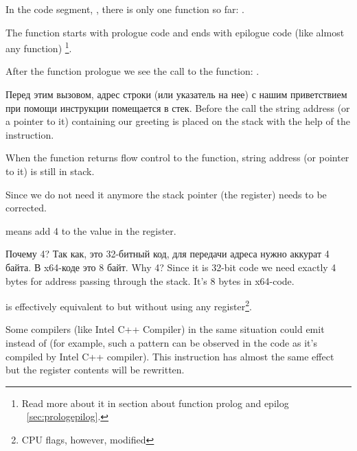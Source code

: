 {In the code segment, , there is only one function so far}: \main.

{The function \main starts with prologue code and ends with epilogue code (like almost any function)}
\footnote{
{Read more about it in section about function prolog and epilog}
~\ref{sec:prologepilog}.}.

{After the function prologue we see the call to the \printf function}: . 

\IFRU
{Перед этим вызовом, адрес строки (или указатель на нее) с нашим приветствием при помощи инструкции \PUSH помещается в стек.}
{Before the call the string address (or a pointer to it) containing our greeting is placed on the stack with the help of the \PUSH instruction.}

{When the \printf function returns flow control to the \main function, string address (or pointer to it) is still in stack.}

{Since we do not need it anymore the stack pointer (the \ESP register) needs to be corrected.}

 
{means add 4 to the value in the \ESP register.}

\IFRU
{Почему 4? Так как, это 32-битный код, для передачи адреса нужно аккурат 4 байта. В x64-коде это 8 байт.}
{Why 4? Since it is 32-bit code we need exactly 4 bytes for address passing through the stack. 
It's 8 bytes in x64-code.}

 
{is effectively equivalent to  but without using any register\footnote{CPU flags, however, modified}.}

{Some compilers (like Intel C++ Compiler) in the same situation could emit  
instead of \ADD (for example, such a pattern can be observed in the \oracle{} code as it's compiled by Intel C++ compiler).
This instruction has almost the same effect but the \ECX register contents will be rewritten.}

